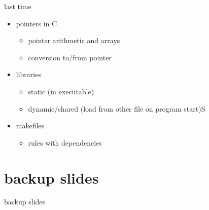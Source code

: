 \date{}
\title{}
\date{}

\begin{frame}
    \titlepage
\end{frame}

\begin{frame}{last time}
    \begin{itemize}
    \item pointers in C
        \begin{itemize}
        \item pointer arithmetic and arrays
        \item conversion to/from pointer
        \end{itemize}
    \item libraries
        \begin{itemize}
        \item static (in executable)
        \item dynamic/shared (load from other file on program start)S
        \end{itemize}
    \item makefiles
        \begin{itemize}
        \item rules with dependencies
        \end{itemize}
    \end{itemize}
\end{frame}






\section{backup slides}
\begin{frame}{backup slides}
\end{frame}


